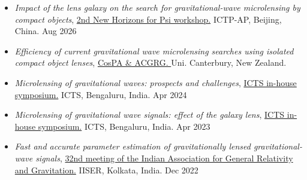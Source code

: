 \begin{itemize}
    \item \textit{Impact of the lens galaxy on the search for gravitational-wave microlensing by compact objects}, \href{https://indico.ictp-ap.ucas.ac.cn/event/3/}{2nd New Horizons for Psi workshop.} ICTP-AP, Beijing, China. \hfill{Aug 2026}
    
    \item \textit{Efficiency of current gravitational wave microlensing searches using isolated compact object lenses}, \href{https://indico.global/event/16063/}{CosPA \& ACGRG. } Uni. Canterbury, New Zealand. \hspace{0.85in}{July 2026}

    \item \textit{Microlensing of gravitational waves: prospects and challenges}, \href{https://www.icts.res.in/inhouse2024}{ICTS in-house symposium.} ICTS, Bengaluru, India. \hfill{Apr 2024}

    \item \textit{Microlensing of gravitational wave signals: effect of the galaxy lens}, \href{https://www.icts.res.in/inhouse2023}{ICTS in-house symposium.} ICTS, Bengaluru, India. \hspace{2.65in} {Apr 2023}

    \item \textit{Fast and accurate parameter estimation of gravitationally lensed gravitational-wave signals}, \href{https://drive.google.com/file/d/1hwDHj8AFhTU_zxyPvj8dZAKg-VReEmGE/view?usp=sharing}{32nd meeting of the Indian Association for General Relativity and Gravitation.} IISER, Kolkata, India. \hfill{Dec 2022}
    
\end{itemize}